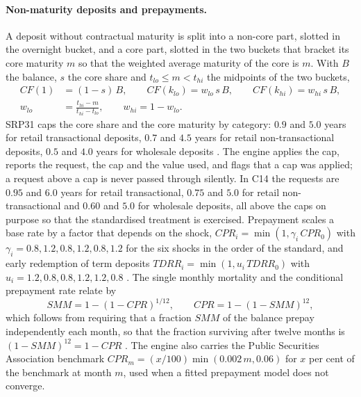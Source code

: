 \paragraph{Non-maturity deposits and prepayments.}
A deposit without contractual maturity is split into a non-core part, slotted in the overnight bucket, and a core part, slotted in the two buckets that bracket its core maturity $m$ so that the weighted average maturity of the core is $m$. With $B$ the balance, $s$ the core share and $t_{lo}\le m<t_{hi}$ the midpoints of the two buckets,
\begin{align}
CF(1)&=(1-s)\,B,\qquad CF(k_{lo})=w_{lo}\,s\,B,\qquad CF(k_{hi})=w_{hi}\,s\,B,\label{eq:alm-nmd}\\
w_{lo}&=\frac{t_{hi}-m}{t_{hi}-t_{lo}},\qquad w_{hi}=1-w_{lo}.\label{eq:alm-weights}
\end{align}
SRP31 caps the core share and the core maturity by category: $0.9$ and $5.0$ years for retail transactional deposits, $0.7$ and $4.5$ years for retail non-transactional deposits, $0.5$ and $4.0$ years for wholesale deposits \citep{alm:srp31}. The engine applies the cap, reports the request, the cap and the value used, and flags that a cap was applied; a request above a cap is never passed through silently. In C14 the requests are $0.95$ and $6.0$ years for retail transactional, $0.75$ and $5.0$ for retail non-transactional and $0.60$ and $5.0$ for wholesale deposits, all above the caps on purpose so that the standardised treatment is exercised. Prepayment scales a base rate by a factor that depends on the shock, $CPR_i=\min(1,\gamma_i\,CPR_0)$ with $\gamma_i=0.8,1.2,0.8,1.2,0.8,1.2$ for the six shocks in the order of the standard, and early redemption of term deposits $TDRR_i=\min(1,u_i\,TDRR_0)$ with $u_i=1.2,0.8,0.8,1.2,1.2,0.8$ \citep{alm:srp31}. The single monthly mortality and the conditional prepayment rate relate by
\begin{equation}
SMM=1-(1-CPR)^{1/12},\qquad CPR=1-(1-SMM)^{12},
\label{eq:alm-smm}
\end{equation}
which follows from requiring that a fraction $SMM$ of the balance prepay independently each month, so that the fraction surviving after twelve months is $(1-SMM)^{12}=1-CPR$ \citep{alm:fuster2022}. The engine also carries the Public Securities Association benchmark $CPR_m=(x/100)\min(0.002\,m,0.06)$ for $x$ per cent of the benchmark at month $m$, used when a fitted prepayment model does not converge.

